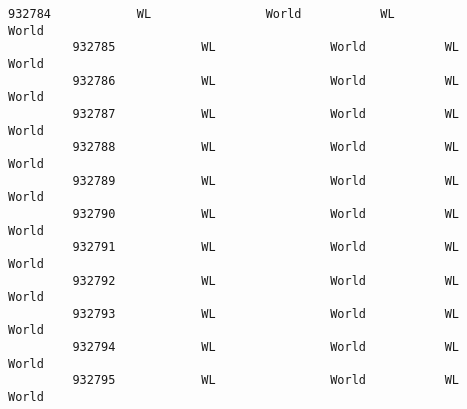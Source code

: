 \documentclass[11pt]{article}
\begin{document}
\begin{Verbatim}[commandchars=\\\{\}]
         932784            WL                World           WL               World   
         932785            WL                World           WL               World   
         932786            WL                World           WL               World   
         932787            WL                World           WL               World   
         932788            WL                World           WL               World   
         932789            WL                World           WL               World   
         932790            WL                World           WL               World   
         932791            WL                World           WL               World   
         932792            WL                World           WL               World   
         932793            WL                World           WL               World   
         932794            WL                World           WL               World   
         932795            WL                World           WL               World   
         

\end{Verbatim}
\end{document}
